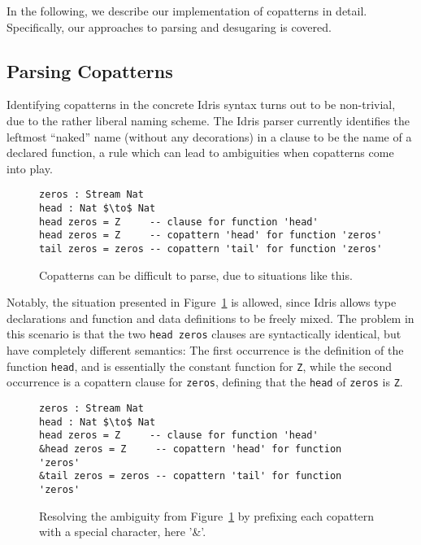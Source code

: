 In the following, we describe our implementation of copatterns in
detail. Specifically, our approaches to parsing and desugaring is covered. 

\subsection{Parsing Copatterns}
\label{sec:parsing-copatterns}
Identifying copatterns in the concrete Idris syntax turns out to be non-trivial,
due to the rather liberal naming scheme. The Idris parser currently identifies
the leftmost ``naked'' name (without any decorations) in a clause to be the name
of a declared function, a rule which can lead to ambiguities when copatterns
come into play.
\begin{figure}[H]
\begin{lstlisting}[mathescape]
zeros : Stream Nat
head : Nat $\to$ Nat
head zeros = Z     -- clause for function 'head'
head zeros = Z     -- copattern 'head' for function 'zeros'
tail zeros = zeros -- copattern 'tail' for function 'zeros'
\end{lstlisting}
  \caption{Copatterns can be difficult to parse, due to situations like
    this.}
  \label{fig:copatterns_parsing_hell}
\end{figure}
Notably, the situation presented in
Figure~\ref{fig:copatterns_parsing_hell} is allowed, since Idris allows type
declarations and function and data definitions to be freely mixed. The problem in this scenario is
that the two \texttt{head zeros} clauses are syntactically identical, but have
completely different semantics: The first occurrence is the definition of the
function \texttt{head}, and is essentially the constant function for \texttt{Z},
while the second occurrence is a copattern clause for \texttt{zeros}, defining
that the \texttt{head} of \texttt{zeros} is \texttt{Z}.
\begin{figure}[H]
\begin{lstlisting}[mathescape]
zeros : Stream Nat
head : Nat $\to$ Nat
head zeros = Z     -- clause for function 'head'
&head zeros = Z     -- copattern 'head' for function 'zeros'
&tail zeros = zeros -- copattern 'tail' for function 'zeros'
\end{lstlisting}
  \caption{Resolving the ambiguity from Figure~\ref{fig:copatterns_parsing_hell}
  by prefixing each copattern with a special character, here '\&'.}
  \label{fig:copatterns_parsing_hell_fixed_ampersand}
\end{figure}
